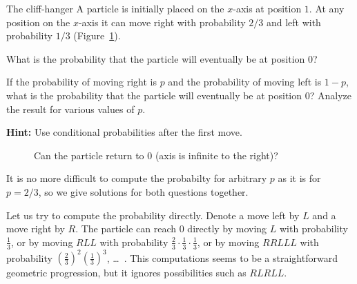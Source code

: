 
\begin{prob}{The cliff-hanger}
A particle is initially placed on the $x$-axis at position $1$. At any position on the $x$-axis it can move right with probability $2/3$ and left with probability $1/3$ (Figure~\ref{f.ruin1}).

 What is the probability that the particle will eventually be at position $0$?

 If the probability of moving right is $p$ and the probability of moving left is $1-p$, what is the probability that the particle will eventually be at position $0$? Analyze the result for various values of $p$.

\textbf{Hint:} Use conditional probabilities after the first move.
\begin{figure}[tb]
\begin{center}
\end{center}
\caption{Can the particle return to $0$ (axis is infinite to the right)?}\label{f.ruin1}
\end{figure}

\end{prob}

\solution{}

It is no more difficult to compute the probabilty for arbitrary $p$ as it is for $p=2/3$, so we give solutions for both questions together.

Let us try to compute the probability directly. Denote a move left by $L$ and a move right by $R$. The particle can reach $0$ directly by moving $L$ with probability $\frac{1}{3}$, or by moving $RLL$ with probability $\frac{2}{3}\cdot\frac{1}{3}\cdot\frac{1}{3}$, or by moving $RRLLL$ with probability $\left(\frac{2}{3}\right)^2\left(\frac{1}{3}\right)^3$, \ldots\ . This computations seems to be a straightforward geometric progression, but it ignores possibilities such as $RLRLL$.

